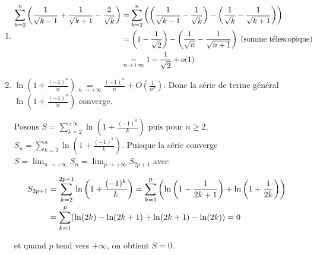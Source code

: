 {{\begin{enumerate}
\begin{center}
\end{center}

\item 

\begin{align*}\ensuremath
\sum_{k=2}^{n}\left(\frac{1}{\sqrt{k-1}}+\frac{1}{\sqrt{k+1}}-\frac{2}{\sqrt{k}}\right)&=\sum_{k=2}^{n}\left(\left(\frac{1}{\sqrt{k-1}}-\frac{1}{\sqrt{k}}\right)-\left(\frac{1}{\sqrt{k}}-\frac{1}{\sqrt{k+1}}\right)\right)\\
 &=\left(1-\frac{1}{\sqrt{2}}\right)-\left(\frac{1}{\sqrt{n}}-\frac{1}{\sqrt{n+1}}\right)\;(\text{somme télescopique})\\
 &\underset{n\rightarrow+\infty}{=}1-\frac{1}{\sqrt{2}}+o(1) 
\end{align*}

\begin{center}
\end{center}

\item  $\ln\left(1+\frac{(-1)^n}{n}\right)\underset{n\rightarrow+\infty}{=}\frac{(-1)^n}{n}+O\left(\frac{1}{n^2}\right)$. Donc la série de terme général $\ln\left(1+\frac{(-1)^n}{n}\right)$ converge.

Posons $S=\sum_{k=2}^{+\infty}\ln\left(1+\frac{(-1)^k}{k}\right)$ puis pour $n\geqslant2$, $S_n=\sum_{k=2}^{n}\ln\left(1+\frac{(-1)^k}{k}\right)$. Puisque la série converge $S=\lim_{n \rightarrow +\infty}S_n=\lim_{p \rightarrow +\infty}S_{2p+1}$ avec

\begin{align*}\ensuremath
S_{2p+1}&=\sum_{k=2}^{2p+1}\ln\left(1+\frac{(-1)^k}{k}\right)=\sum_{k=1}^{p}\left(\ln\left(1-\frac{1}{2k+1}\right)+\ln\left(1+\frac{1}{2k}\right)\right)\\
 &=\sum_{k=1}^{p}(\ln(2k)-\ln(2k+1)+\ln(2k+1)-\ln(2k))=0
\end{align*}

et quand $p$ tend vers $+\infty$, on obtient $S = 0$.

\begin{center}
\end{center}


\end{enumerate}}}
